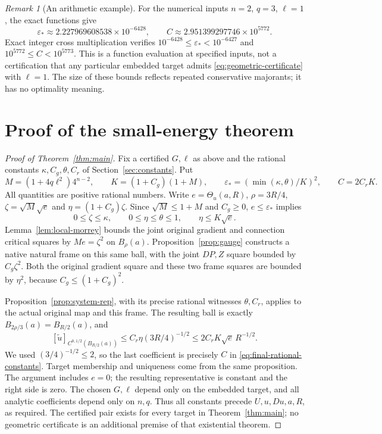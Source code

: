 \documentclass[reqno,11pt]{amsart}
\numberwithin{equation}{section}
\theoremstyle{definition}
\theoremstyle{remark}
\newtheorem{remark}[theorem]{Remark}
\newcommand{\Th}{\Theta}
\begin{document}
\begin{remark}[An arithmetic example]\label{rem:example}
For the numerical inputs $n=2$, $q=3$, $\ell=1$, the exact functions give
\[
 \varepsilon_*\approx2.227969608538\times10^{-6428},\qquad
 C\approx2.951399297746\times10^{5772}.
\]
Exact integer cross multiplication verifies
$10^{-6428}\leq\varepsilon_*<10^{-6427}$ and
$10^{5772}\leq C<10^{5773}$. This is a function evaluation at specified
inputs, not a certification that any particular embedded target admits
\eqref{eq:geometric-certificate} with $\ell=1$. The size of these bounds
reflects repeated conservative majorants; it has no optimality meaning.
\end{remark}

\section{Proof of the small-energy theorem}\label{sec:assembly}
\begin{proof}[Proof of Theorem~\ref{thm:main}]
Fix a certified $G,\ell$ as above and the rational constants
$\kappa,C_g,\theta,C_r$ of Section~\ref{sec:constants}. Put
\begin{equation}\label{eq:final-rational-constants}
 M=(1+4q\ell^2)4^{n-2},\qquad K=(1+C_g)(1+M),\qquad
 \varepsilon_*=(\min(\kappa,\theta)/K)^2,\qquad C=2C_rK.
\end{equation}
All quantities are positive rational numbers. Write $e=\Th_u(a,R)$,
$\rho=3R/4$, $\zeta=\sqrt M\sqrt e$ and
$\eta=(1+C_g)\zeta$. Since $\sqrt M\leq1+M$ and $C_g\geq0$,
$e\leq\varepsilon_*$ implies
\[
 0\leq\zeta\leq\kappa,\qquad
 0\leq\eta\leq\theta\leq1,\qquad \eta\leq K\sqrt e.
\]
Lemma~\ref{lem:local-morrey} bounds the joint original gradient and
connection critical squares by $Me=\zeta^2$ on $B_\rho(a)$.
Proposition~\ref{prop:gauge} constructs a native natural frame on this
same ball, with the joint $DP,Z$ square bounded by $C_g\zeta^2$.
Both the original gradient square and these two frame squares are
bounded by $\eta^2$, because $C_g\leq(1+C_g)^2$.

Proposition~\ref{prop:system-rep}, with its precise rational witnesses
$\theta,C_r$, applies to the actual original map and this frame.
The resulting ball is exactly $B_{2\rho/3}(a)=B_{R/2}(a)$, and
\[
 [\widetilde u]_{C^{0,1/2}(B_{R/2}(a))}
 \leq C_r\eta(3R/4)^{-1/2}
 \leq2C_rK\sqrt e\,R^{-1/2}.
\]
We used $(3/4)^{-1/2}\leq2$, so the last coefficient is precisely
$C$ in \eqref{eq:final-rational-constants}. Target membership and
uniqueness come from the same proposition. The argument includes
$e=0$; the resulting representative is constant and the right side is
zero. The chosen $G,\ell$ depend only on the embedded target, and all
analytic coefficients depend only on $n,q$. Thus all constants precede
$U,u,Du,a,R$, as required. The certified pair exists for every target
in Theorem~\ref{thm:main}; no geometric certificate is an additional
premise of that existential theorem.
\end{proof}
\end{document}
